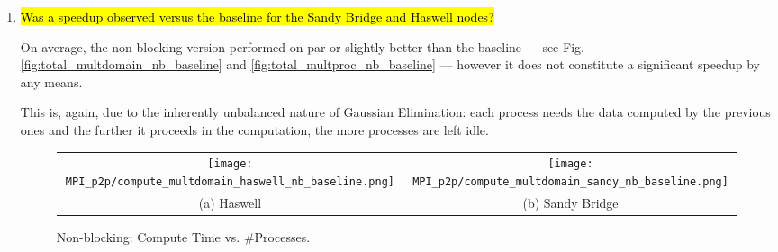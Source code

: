 \begin{enumerate}
	We also changed the communication pattern so that pivots are propagated after each row computation, instead of communicating after the computation entire local block. This has the benefit of allowing an earlier start of all the processes, however it does not really improve the cumulative time spent by the various processes waiting for data. This can also be seen in Fig.\ref{fig:mpi_multdomain_nb_baseline} and \ref{fig:mpi_multproc_nb_baseline}: the time spent in MPI operations or waits is not reduced in a relevant way with non-blocking communication and in some cases it even increases.

	So there is some overlap, but the inherent load imbalance of the algorithm and the sequential dependencies across the processes basically nullify any benefit coming from the computation-communication overlap.

	\item \hl{Was a speedup observed versus the baseline for the Sandy Bridge and Haswell nodes?}

	On average, the non-blocking version performed on par or slightly better than the baseline --- see Fig.\ref{fig:total_multdomain_nb_baseline} and \ref{fig:total_multproc_nb_baseline} --- however it does not constitute a significant speedup by any means.

	This is, again, due to the inherently unbalanced nature of Gaussian Elimination: each process needs the data computed by the previous ones and the further it proceeds in the computation, the more processes are left idle.

	\begin{figure}[p] %
		\begin{tabular}{cc}
			\hspace*{-0.35\linewidth}\texttt{[image: MPI\_p2p/compute\_multdomain\_haswell\_nb\_baseline.png]} & \hspace*{-0.05\linewidth}\texttt{[image: MPI\_p2p/compute\_multdomain\_sandy\_nb\_baseline.png]} \\
			\hspace*{-0.45\linewidth}(a) Haswell & \hspace*{-0.15\linewidth}(b) Sandy Bridge\\[6pt]
		\end{tabular}
		\caption{Non-blocking: Compute Time vs. \#Processes.}
		\label{fig:compute_multdomain_nb_baseline}
	\end{figure}
	

\end{enumerate}
